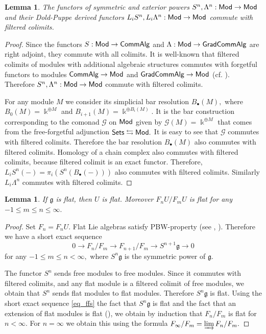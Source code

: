 \documentclass{amsart}
\numberwithin{equation}{section}
\newtheorem{lemma}[theorem]{Lemma}
\theoremstyle{definition}
\def\GG{\mathcal{G}}
\def\gg{\mathfrak{g}}
\def\kk{\Bbbk}
\begin{document}
\begin{lemma}\label{lemma_commuting_filt_colim}
The functors of symmetric and exterior powers $S^n,\Lambda^n:{\sf Mod}\to {\sf Mod}$ and their Dold-Puppe derived functors $L_i S^n,L_i\Lambda^n :{\sf Mod}\to {\sf Mod}$ commute with filtered colimits.
\end{lemma}
\begin{proof}
Since the functors $S:{\sf Mod} \to {\sf CommAlg}$ and $\Lambda:{\sf Mod}\to {\sf GradCommAlg}$ are right adjoint, they commute with all colimits. It is well-known that filtered colimits of modules with additional algebraic structures commutes with forgetful functors to modules ${\sf CommAlg}\to {\sf Mod}$ and ${\sf GradCommAlg}\to {\sf Mod}$ (cf. \cite[Ch. IX, \S 1]{mclane1971categories}). Therefore $S^n, \Lambda^n:{\sf Mod}\to {\sf Mod}$  commute with filtered colimits. 

 For any module $M$ we consider its simplicial bar resolution $B_\bullet(M),$ where $B_0(M)=\kk^{\oplus M}$ and $B_{i+1}(M)=\kk^{\oplus B_i(M)}.$ It is the bar construction corresponding to the comonad $\GG$ on ${\sf Mod}$ given by $\GG(M)=\kk^{\oplus M}$ that comes from the free-forgetful adjunction ${\sf Sets}\leftrightarrows {\sf Mod}.$  It is easy to see that $\GG$ commutes with filtered colimits. Therefore the bar resolution $B_\bullet(M)$ also commutes with filtered colimits. Homology of a chain complex also commutes with filtered colimits, because filtered colimit is an exact functor. Therefore, $L_i S^n(-)= \pi_i(S^n (B_\bullet(-)))$ also commutes with filtered colimits. Similarly $L_i\Lambda^n$ commutes with filtered colimits.
\end{proof}




\begin{lemma}\label{lemma_flatU}
If $\gg$ is flat, then $U$ is flat. Moreover $F_nU/F_mU$ is flat for any $-1 \leq  m\leq n\leq \infty.$  
\end{lemma}
\begin{proof} Set $F_n=F_nU.$
Flat Lie  algebras satisfy PBW-property (see \cite[Th. 5.9]{grinberg2011poincare}, \cite{higgins1969baer}). Therefore we have a short exact sequence 
\begin{equation}\label{eq_ffs}
0\longrightarrow F_{n}/F_m \longrightarrow F_{n+1}/F_m \longrightarrow S^{n+1}\gg \longrightarrow 0    
\end{equation}
for any $-1 \leq m\leq n<\infty,$
where $S^n\gg$ is the symmetric power of $\gg.$ 

The functor $S^n$ sends free modules to free modules. Since it commutes with filtered colimits, and any flat module is a filtered colimit of free modules, we obtain that $S^n$ sends flat modules to flat modules. 
Therefore $S^n\gg$ is flat. 
Using the short exact sequence 
\eqref{eq_ffs} the fact that  $S^n\gg$ is flat and the fact  that an extension of flat modules is flat (\cite[Cor. 4.86]{lam2012lectures}), we obtain by induction that $F_n/F_m$ is flat for $n<\infty$. For $n=\infty$ we obtain this using the formula  $F_\infty/F_m=\varinjlim F_n/F_m.$ 
\end{proof}
\end{document}
